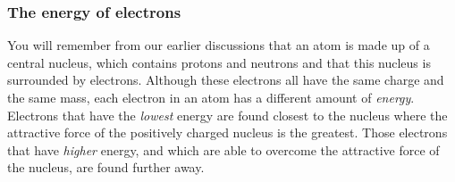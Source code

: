             \subsubsection{ The energy of electrons}
            \nopagebreak
        \label{m38741*id259210}You will remember from our earlier discussions that an atom is made up of a central nucleus, which contains protons and neutrons and that this nucleus is surrounded by electrons. Although these electrons all have the same charge and the same mass, each electron in an atom has a different amount of \textsl{energy}. Electrons that have the \textsl{lowest} energy are found closest to the nucleus where the attractive force of the positively charged nucleus is the greatest. Those electrons that have \textsl{higher} energy, and which are able to overcome the attractive force of the nucleus, are found further away.\par 
      \label{m38741*uid81}
